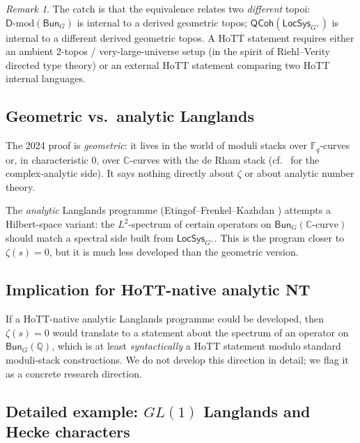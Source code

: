 \documentclass[12pt]{article}
\theoremstyle{definition}
\theoremstyle{remark}
\newtheorem{remark}[theorem]{Remark}
\newcommand{\C}{\mathbb{C}}
\newcommand{\Q}{\mathbb{Q}}
\newcommand{\F}{\mathbb{F}}
\begin{document}
\begin{remark}\label{rem:internal}
The catch is that the equivalence relates two \emph{different} topoi:
$\mathsf{D}\text{-mod}(\mathsf{Bun}_G)$ is internal to a derived geometric
topos; $\mathsf{QCoh}(\mathsf{LocSys}_{G^\vee})$ is internal to a different
derived geometric topos. A HoTT statement requires either an ambient
2-topos / very-large-universe setup (in the spirit of Riehl--Verity directed
type theory) or an external HoTT statement comparing two HoTT internal
languages.
\end{remark}

\subsection{Geometric vs.\ analytic Langlands}

The 2024 proof is \emph{geometric}: it lives in the world of moduli stacks
over $\F_q$-curves or, in characteristic 0, over $\C$-curves with the de
Rham stack (cf.~\cite{ClausenScholzeComplex} for the complex-analytic side). It says nothing directly about $\zeta$ or about analytic number
theory.

The \emph{analytic} Langlands programme (Etingof--Frenkel--Kazhdan
\cite{EFK2025AnalyticLanglands}) attempts a Hilbert-space variant: the
$L^2$-spectrum of certain operators on $\mathsf{Bun}_G(\C\text{-curve})$
should match a spectral side built from $\mathsf{LocSys}_{G^\vee}$. This is
the program closer to $\zeta(s) = 0$, but it is much less developed than
the geometric version.

\subsection{Implication for HoTT-native analytic NT}

If a HoTT-native analytic Langlands programme could be developed, then
$\zeta(s) = 0$ would translate to a statement about the spectrum of an
operator on $\mathsf{Bun}_G(\Q)$, which is at least \emph{syntactically} a
HoTT statement modulo standard moduli-stack constructions. We do not
develop this direction in detail; we flag it as a concrete research direction.

\subsection{Detailed example: \texorpdfstring{$GL(1)$}{GL(1)} Langlands and Hecke characters}\label{subsec:GL1}
\end{document}
